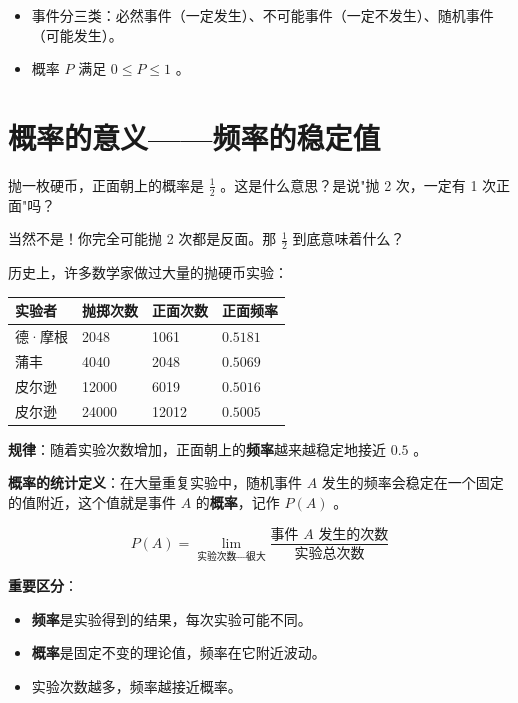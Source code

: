 \begin{keytakeaway}


\begin{itemize}
  \item 事件分三类：必然事件（一定发生）、不可能事件（一定不发生）、随机事件（可能发生）。
  \item 概率 $P$ 满足 $0 \leq P \leq 1$ 。
\end{itemize}


\end{keytakeaway}



\section*{概率的意义——频率的稳定值}


\begin{explore}


抛一枚硬币，正面朝上的概率是 $\frac{1}{2}$ 。这是什么意思？是说"抛 2 次，一定有 1 次正面"吗？

当然不是！你完全可能抛 2 次都是反面。那 $\frac{1}{2}$ 到底意味着什么？

\end{explore}

\begin{understand}


历史上，许多数学家做过大量的抛硬币实验：

\begin{center}
\begin{tabular}{llll}
\toprule
实验者 & 抛掷次数 & 正面次数 & 正面频率 \\
\midrule
德·摩根 & 2048 & 1061 & $0.5181$ \\
蒲丰 & 4040 & 2048 & $0.5069$ \\
皮尔逊 & 12000 & 6019 & $0.5016$ \\
皮尔逊 & 24000 & 12012 & $0.5005$ \\
\bottomrule
\end{tabular}
\end{center}


\textbf{规律}：随着实验次数增加，正面朝上的\textbf{频率}越来越稳定地接近 $0.5$ 。

\textbf{概率的统计定义}：在大量重复实验中，随机事件 $A$ 发生的频率会稳定在一个固定的值附近，这个值就是事件 $A$ 的\textbf{概率}，记作 $P(A)$ 。

\[
P(A) = \lim_{\text{实验次数} \to \text{很大}} \frac{\text{事件 } A \text{ 发生的次数}}{\text{实验总次数}}
\]


\textbf{重要区分}：
\begin{itemize}
  \item \textbf{频率}是实验得到的结果，每次实验可能不同。
  \item \textbf{概率}是固定不变的理论值，频率在它附近波动。
  \item 实验次数越多，频率越接近概率。
\end{itemize}


\end{understand}

